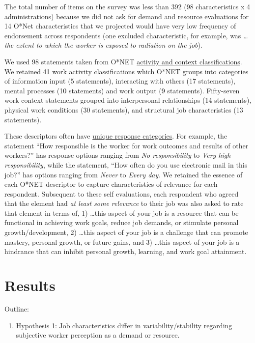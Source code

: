 \documentclass[
  man]{apa6}
\providecommand{\tightlist}{%
  \setlength{\itemsep}{0pt}\setlength{\parskip}{0pt}}
\begin{document}
The total number of items on the survey was less than 392 (98 characteristics x 4 administrations) because we did not ask for demand and resource evaluations for 14 O*Net characteristics that we projected would have very low frequency of endorsement across respondents (one excluded characteristic, for example, was \emph{\ldots the extent to which the worker is exposed to radiation on the job}).

We used 98 statements taken from O*NET \href{https://www.ONETonline.org/find/descriptor/result/4.A.1.b.3}{activity and context classifications}. We retained 41 work activity classifications which O*NET groups into categories of information input (5 statements), interacting with others (17 statements), mental processes (10 statements) and work output (9 statements). Fifty-seven work context statements grouped into interpersonal relationships (14 statements), physical work conditions (30 statements), and structural job characteristics (13 statements).

These descriptors often have \href{https://www.ONETonline.org/find/descriptor/result/4.C.1.c.2}{unique response categories}. For example, the statement ``How responsible is the worker for work outcomes and results of other workers?'' has response options ranging from \emph{No responsibility} to \emph{Very high responsibility}, while the statement, ``How often do you use electronic mail in this job?'' has options ranging from \emph{Never} to \emph{Every day}. We retained the essence of each O*NET descriptor to capture characteristics of relevance for each respondent. Subsequent to these self evaluations, each respondent who agreed that the element had \emph{at least some relevance} to their job was also asked to rate that element in terms of, 1) \ldots this aspect of your job is a resource that can be functional in achieving work goals, reduce job demands, or stimulate personal growth/development, 2) \ldots this aspect of your job is a challenge that can promote mastery, personal growth, or future gains, and 3) \ldots this aspect of your job is a hindrance that can inhibit personal growth, learning, and work goal attainment.

\hypertarget{results}{%
\section{Results}\label{results}}

Outline:

\begin{enumerate}
\def\labelenumi{\arabic{enumi}.}
\tightlist
\item
  Hypothesis 1: Job characteristics differ in variability/stability regarding subjective worker perception as a demand or resource.
\end{enumerate}
\end{document}
